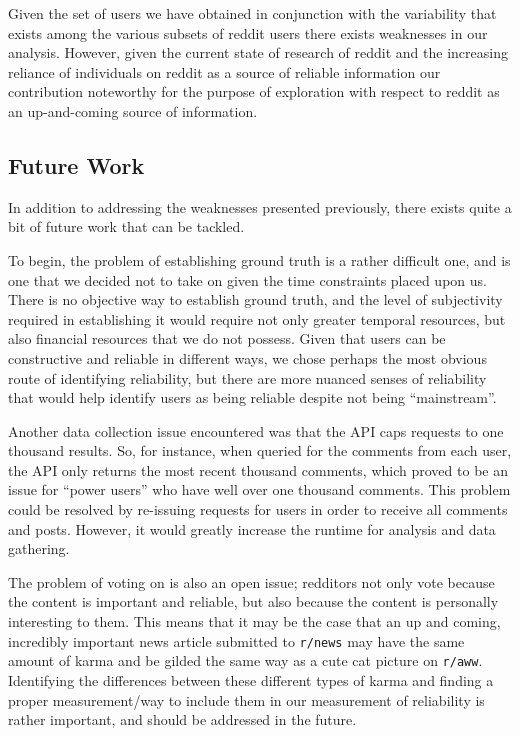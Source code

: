 Given the set of users we have obtained in conjunction with the variability that
exists among the various subsets of reddit users there exists weaknesses in our
analysis. However, given the current state of research of reddit and the
increasing reliance of individuals on reddit as a source of reliable information
our contribution noteworthy for the purpose of exploration with respect to
reddit as an up-and-coming source of information.


\subsection{Future Work} %
\label{sub:future_work}
In addition to addressing the weaknesses presented previously, there exists
quite a bit of future work that can be tackled.

To begin, the problem of establishing ground truth is a rather difficult one,
and is one that we decided not to take on given the time constraints placed upon
us. There is no objective way to establish ground truth, and the level of
subjectivity required in establishing it would require not only greater temporal
resources, but also financial resources that we do not possess. Given that users
can be constructive and reliable in different ways, we chose perhaps the most
obvious route of identifying reliability, but there are more nuanced senses of
reliability that would help identify users as being reliable despite not being
``mainstream''.

Another data collection issue encountered was that the \reddit{} API caps
requests to one thousand results. So, for instance, when queried for the
comments from each user, the API only returns the most recent thousand comments,
which proved to be an issue for ``power users'' who have well over one thousand
comments. This problem could be resolved by re-issuing requests for users in
order to receive all comments and posts. However, it would greatly increase the
runtime for analysis and data gathering.

The problem of voting on \reddit{} is also an open issue; redditors not only
vote because the content is important and reliable, but also because the content
is personally interesting to them. This means that it may be the case that an up
and coming, incredibly important news article submitted to \texttt{r/news} may
have the same amount of karma and be gilded the same way as a cute cat picture
on \texttt{r/aww}. Identifying the differences between these different types of
karma and finding a proper measurement/way to include them in our measurement of
reliability is rather important, and should be addressed in the future.

